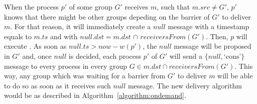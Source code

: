 \documentclass[times, 10pt]{article}
\begin{document}
When the process $p'$ of some group $G'$ receives $m$, such that $m.src \neq G'$, $p'$ knows that there might be other groups depeding on the barrier of $G'$ to deliver $m$. For that reason, it will immediately create a $null$ message with a timestamp equals to $m.ts$ and with $null.dst = m.dst$ $\cap$ $receiversFrom(G')$. Then, $p$ will execute \mbox{}. As soon as $null.ts > now - w(p')$, the $null$ message will be proposed in $G'$ and, once $null$ is decided, each process $p'$ of $G'$ will send a $\{null, \text{`cons'}\}$ message to every process in every group \mbox{$G \in m.dst \cap receiversFrom(G')$}. This way, any group which was waiting for a barrier from $G'$ to deliver $m$ will be able to do so as soon as it receives such $null$ message. The new delivery algorithm would be as described in \mbox{Algorithm {\ref{algorithm:ondemand}}}.
\end{document}
